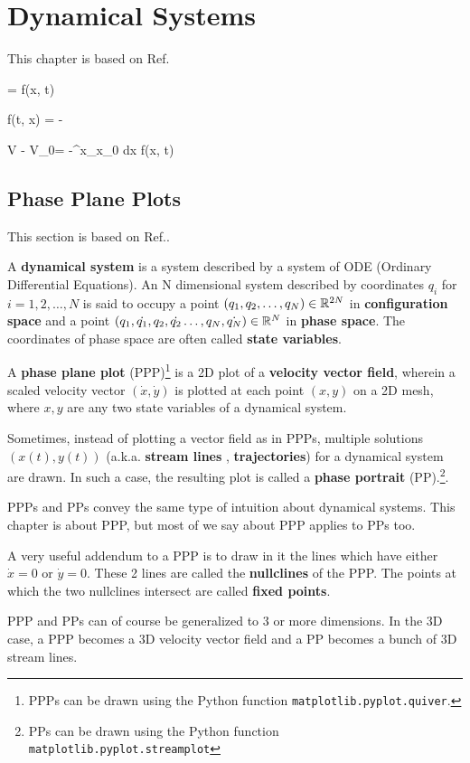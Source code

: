 \chapter{Dynamical Systems}
\label{ch-dynamical-sys}

This chapter is based on 
Ref.\cite{dynamical-fuchs}

\beq
{} = f(x, t)
\eeq

\beq
f(t, x) = -
\eeq

\beq
V - V_0= -\int^x_{x_0} dx \; f(x, t)
\eeq

\section{Phase Plane Plots}
This section is based on Ref.\cite{wiki-phase-plane}.

A {\bf dynamical system} is a system described by a system of 
ODE (Ordinary Differential Equations). 
An N dimensional system described by 
coordinates $q_i$ for $i=1,2, \ldots, N$ 
is said to occupy a point $(q_1, q_2, \ldots, q_N)\in{ \mathbb{R}}^{2N}$
in  {\bf configuration space}
and a point $(q_1,\dot{q_1}, q_2, \dot{q_2}\ldots, q_N, \dot{q_N})\in { \mathbb{R}}^N$
in {\bf phase space}.  The coordinates of phase 
space are often called {\bf state variables}.

A {\bf phase plane plot} (PPP)\footnote{
PPPs can be drawn using
the Python function {\tt matplotlib.pyplot.quiver}.} 
is a 2D plot of a {\bf velocity vector field}, wherein a scaled 
velocity vector  
$(\dot{x}, \dot{y})$ is plotted at each point $(x,y)$
on a 2D mesh,
where $x,y$ are any two state variables of a
dynamical system. 

Sometimes, instead of plotting a vector field as in PPPs, 
multiple solutions $(x(t), y(t))$
 (a.k.a. {\bf stream lines}
, {\bf trajectories})
for a dynamical system are drawn. In such a case, the resulting plot is called a {\bf phase portrait} (PP).\footnote{
PPs can be drawn using the Python function {\tt matplotlib.pyplot.streamplot}}.

PPPs and PPs convey the same
type of intuition about dynamical systems.
This chapter is about PPP,
but most of we say about PPP applies to PPs too.

A very useful addendum to a PPP is to draw in it the lines 
which have either $\dot{x}=0$ or $\dot{y}=0$. These 2 lines are
called the
{\bf nullclines} of the PPP.
The points at which the two nullclines intersect
are called {\bf fixed points}. 

PPP and PPs can of course be generalized to 3 or more dimensions.
In the 3D case, a PPP becomes a 3D velocity vector  field 
and a PP becomes 
a bunch of 3D stream lines.

